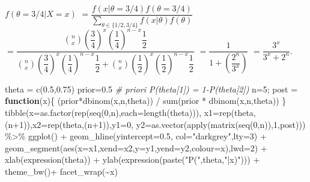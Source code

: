\documentclass[
]{book}
\newenvironment{Shaded}{\begin{snugshade}}{\end{snugshade}}
\newcommand{\AttributeTok}[1]{\textcolor[rgb]{0.77,0.63,0.00}{#1}}
\newcommand{\CommentTok}[1]{\textcolor[rgb]{0.56,0.35,0.01}{\textit{#1}}}
\newcommand{\ControlFlowTok}[1]{\textcolor[rgb]{0.13,0.29,0.53}{\textbf{#1}}}
\newcommand{\DecValTok}[1]{\textcolor[rgb]{0.00,0.00,0.81}{#1}}
\newcommand{\FloatTok}[1]{\textcolor[rgb]{0.00,0.00,0.81}{#1}}
\newcommand{\FunctionTok}[1]{\textcolor[rgb]{0.00,0.00,0.00}{#1}}
\newcommand{\NormalTok}[1]{#1}
\newcommand{\OtherTok}[1]{\textcolor[rgb]{0.56,0.35,0.01}{#1}}
\newcommand{\SpecialCharTok}[1]{\textcolor[rgb]{0.00,0.00,0.00}{#1}}
\newcommand{\StringTok}[1]{\textcolor[rgb]{0.31,0.60,0.02}{#1}}
\begin{document}
\(f(\theta=3/4|X=x)\) \(=\dfrac{f(x|\theta=3/4)f(\theta=3/4)}{\displaystyle \sum_{\theta\in \{1/2,3/4\}}f(x|\theta)f(\theta)}\) \(=\dfrac{\displaystyle \binom{n}{x}\left(\dfrac{3}{4}\right)^x\left(\dfrac{1}{4}\right)^{n-x}\dfrac{1}{2}}{\displaystyle \binom{n}{x}\left(\dfrac{3}{4}\right)^x\left(\dfrac{1}{4}\right)^{n-x}\dfrac{1}{2}+\displaystyle\binom{n}{x}\left(\dfrac{1}{2}\right)^x\left(\dfrac{1}{2}\right)^{n-x}\dfrac{1}{2}}\) \(=\dfrac{1}{1+\left(\dfrac{2^n}{3^x}\right)}\) \(=\dfrac{3^x}{3^x + 2^n}\).

\begin{Shaded}
\begin{Highlighting}[]
\NormalTok{theta }\OtherTok{=} \FunctionTok{c}\NormalTok{(}\FloatTok{0.5}\NormalTok{,}\FloatTok{0.75}\NormalTok{)}
\NormalTok{prior}\OtherTok{=}\FloatTok{0.5} \CommentTok{\# priori P(theta[1]) = 1{-}P(theta[2])}
\NormalTok{n}\OtherTok{=}\DecValTok{5}\NormalTok{;}
\NormalTok{post }\OtherTok{=} \ControlFlowTok{function}\NormalTok{(x)\{ }
\NormalTok{  (prior}\SpecialCharTok{*}\FunctionTok{dbinom}\NormalTok{(x,n,theta)) }\SpecialCharTok{/} \FunctionTok{sum}\NormalTok{(prior }\SpecialCharTok{*} \FunctionTok{dbinom}\NormalTok{(x,n,theta)) \}}
\FunctionTok{tibble}\NormalTok{(}\AttributeTok{x=}\FunctionTok{as.factor}\NormalTok{(}\FunctionTok{rep}\NormalTok{(}\FunctionTok{seq}\NormalTok{(}\DecValTok{0}\NormalTok{,n),}\AttributeTok{each=}\FunctionTok{length}\NormalTok{(theta))),}
    \AttributeTok{x1=}\FunctionTok{rep}\NormalTok{(theta,(n}\SpecialCharTok{+}\DecValTok{1}\NormalTok{)),}\AttributeTok{x2=}\FunctionTok{rep}\NormalTok{(theta,(n}\SpecialCharTok{+}\DecValTok{1}\NormalTok{)),}\AttributeTok{y1=}\DecValTok{0}\NormalTok{,}
    \AttributeTok{y2=}\FunctionTok{as.vector}\NormalTok{(}\FunctionTok{apply}\NormalTok{(}\FunctionTok{matrix}\NormalTok{(}\FunctionTok{seq}\NormalTok{(}\DecValTok{0}\NormalTok{,n)),}\DecValTok{1}\NormalTok{,post))) }\SpecialCharTok{\%\textgreater{}\%} 
  \FunctionTok{ggplot}\NormalTok{() }\SpecialCharTok{+} \FunctionTok{geom\_hline}\NormalTok{(}\AttributeTok{yintercept=}\FloatTok{0.5}\NormalTok{, }\AttributeTok{col=}\StringTok{"darkgrey"}\NormalTok{,}\AttributeTok{lty=}\DecValTok{3}\NormalTok{) }\SpecialCharTok{+}
  \FunctionTok{geom\_segment}\NormalTok{(}\FunctionTok{aes}\NormalTok{(}\AttributeTok{x=}\NormalTok{x1,}\AttributeTok{xend=}\NormalTok{x2,}\AttributeTok{y=}\NormalTok{y1,}\AttributeTok{yend=}\NormalTok{y2,}\AttributeTok{colour=}\NormalTok{x),}\AttributeTok{lwd=}\DecValTok{2}\NormalTok{) }\SpecialCharTok{+} 
  \FunctionTok{xlab}\NormalTok{(}\FunctionTok{expression}\NormalTok{(theta)) }\SpecialCharTok{+} \FunctionTok{ylab}\NormalTok{(}\FunctionTok{expression}\NormalTok{(}\FunctionTok{paste}\NormalTok{(}\StringTok{"P("}\NormalTok{,theta,}\StringTok{"|x)"}\NormalTok{))) }\SpecialCharTok{+}
  \FunctionTok{theme\_bw}\NormalTok{()}\SpecialCharTok{+}
  \FunctionTok{facet\_wrap}\NormalTok{(}\SpecialCharTok{\textasciitilde{}}\NormalTok{x)}
\end{Highlighting}
\end{Shaded}
\end{document}
